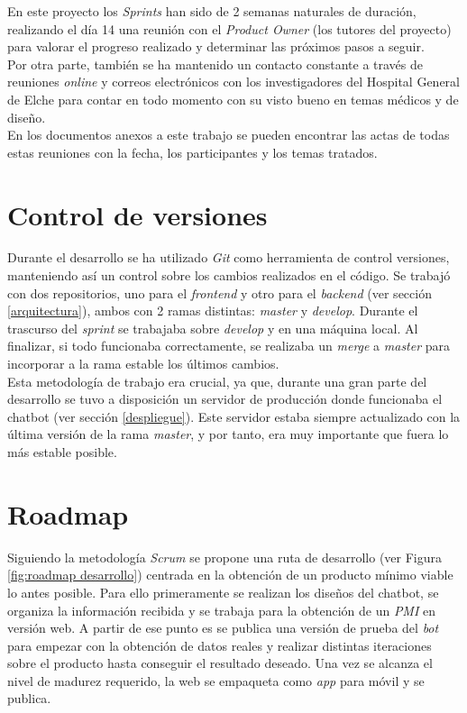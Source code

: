 En este proyecto los \textit{Sprints} han sido de 2 semanas naturales de duración, realizando el día 14 una reunión con el \textit{Product Owner} (los tutores del proyecto) para valorar el progreso realizado y determinar las próximos pasos a seguir. \\

Por otra parte, también se ha mantenido un contacto constante a través de reuniones \textit{online} y correos electrónicos con los investigadores del Hospital General de Elche para contar en todo momento con su visto bueno en temas médicos y de diseño.\\

En los documentos anexos a este trabajo se pueden encontrar las actas de todas estas reuniones con la fecha, los participantes y los temas tratados.\\

\section{Control de versiones}
Durante el desarrollo se ha utilizado \textit{Git} como herramienta de control versiones, manteniendo así un control sobre los cambios realizados en el código. Se trabajó con dos repositorios, uno para el \textit{frontend} \cite{gitApp} y otro para el \textit{backend} \cite{gitChatbot} (ver sección \ref{arquitectura}), ambos con 2 ramas distintas: \textit{master} y \textit{develop}. Durante el trascurso del \textit{sprint} se trabajaba sobre \textit{develop} y en una máquina local. Al finalizar, si todo funcionaba correctamente, se realizaba un \textit{merge} a \textit{master} para incorporar a la rama estable los últimos cambios.\\

Esta metodología de trabajo era crucial, ya que, durante una gran parte del desarrollo se tuvo a disposición un servidor de producción donde funcionaba el chatbot (ver sección \ref{despliegue}). Este servidor estaba siempre actualizado con la última versión de la rama \textit{master}, y por tanto, era muy importante que fuera lo más estable posible.\\

\section{Roadmap}
\label{roadmap}
Siguiendo la metodología \textit{Scrum} se propone una ruta de desarrollo (ver Figura \ref{fig:roadmap desarrollo}) centrada en la obtención de un producto mínimo viable lo antes posible. Para ello primeramente se realizan los diseños del chatbot, se organiza la información recibida y se trabaja para la obtención de un \textit{PMI} en versión web. A partir de ese punto es se publica una versión de prueba del \textit{bot} para empezar con la obtención de datos reales  y realizar distintas iteraciones sobre el producto hasta conseguir el resultado deseado. Una vez se alcanza el nivel de madurez requerido, la web se empaqueta como \textit{app} para móvil y se publica.\\

